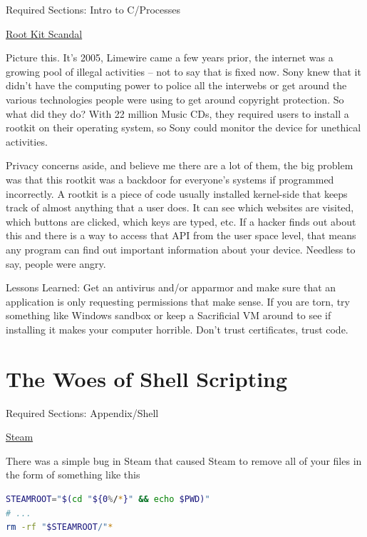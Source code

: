 Required Sections: Intro to C/Processes

\href{https://en.wikipedia.org/wiki/Sony_BMG_copy_protection_rootkit_scandal}{Root Kit Scandal}

Picture this.
It's 2005, Limewire came a few years prior, the internet was a growing pool of illegal activities -- not to say that is fixed now.
Sony knew that it didn't have the computing power to police all the interwebs or get around the various technologies people were using to get around copyright protection.
So what did they do?
With 22 million Music CDs, they required users to install a rootkit on their operating system, so Sony could monitor the device for unethical activities.

Privacy concerns aside, and believe me there are a lot of them, the big problem was that this rootkit was a backdoor for everyone's systems if programmed incorrectly.
A rootkit is a piece of code usually installed kernel-side that keeps track of almost anything that a user does.
It can see which websites are visited, which buttons are clicked, which keys are typed, etc.
If a hacker finds out about this and there is a way to access that API from the user space level, that means any program can find out important information about your device.
Needless to say, people were angry.

Lessons Learned: Get an antivirus and/or apparmor and make sure that an application is only requesting permissions that make sense. If you are torn, try something like Windows sandbox or keep a Sacrificial VM around to see if installing it makes your computer horrible. Don't trust certificates, trust code.

\section{The Woes of Shell Scripting}
\label{pm:steam_rm}

Required Sections: Appendix/Shell

\href{https://www.pcworld.com/article/2871653/scary-steam-for-linux-bug-erases-all-the-personal-files-on-your-pc.html}{Steam}

There was a simple bug in Steam that caused Steam to remove all of your files in the form of something like this

\begin{lstlisting}[language=bash]
STEAMROOT="$(cd "${0%/*}" && echo $PWD)"
# ...
rm -rf "$STEAMROOT/"*
\end{lstlisting}

